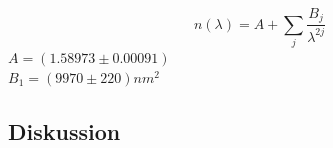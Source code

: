 \documentclass[12pt,a4paper]{article}
\begin{document}
\begin{multicols}{2}

$$n(\lambda) = A + \sum_{j} \frac{B_j}{\lambda^{2j}}$$
$A=(1.58973 \pm 0.00091)$\\
$B_1 = (9970 \pm 220)nm^2$


\subsection{Diskussion}


\end{multicols}
\end{document}
